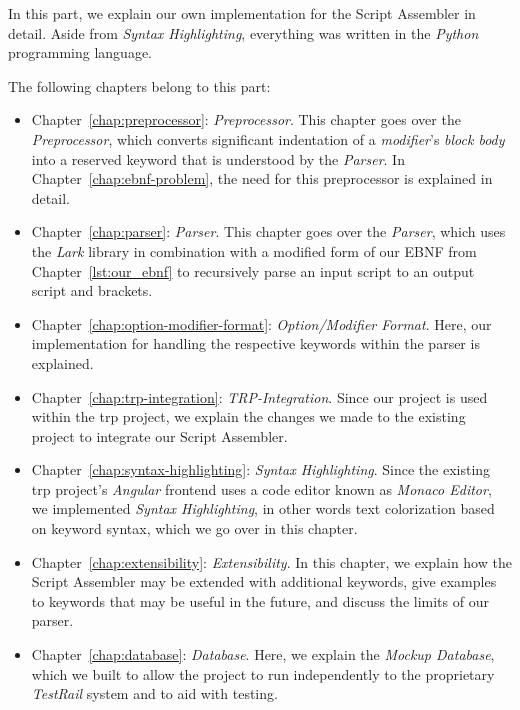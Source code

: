 
In this part, we explain our own implementation for the Script Assembler in detail. Aside from \textit{Syntax Highlighting}, everything was written in the \textit{Python} programming language.

The following chapters belong to this part:
\begin{itemize}
    \item Chapter~\ref{chap:preprocessor}: \textit{Preprocessor}. This chapter goes over the \textit{Preprocessor}, which converts significant indentation of a \textit{modifier}'s \textit{block body} into a reserved keyword that is understood by the \textit{Parser}. In Chapter~\ref{chap:ebnf-problem}, the need for this preprocessor is explained in detail.
    \item Chapter~\ref{chap:parser}: \textit{Parser}. This chapter goes over the \textit{Parser}, which uses the \textit{Lark} library in combination with a modified form of our EBNF from Chapter~\ref{lst:our_ebnf} to recursively parse an input script to an output script and brackets. 
    \item Chapter~\ref{chap:option-modifier-format}: \textit{Option/Modifier Format}. Here, our implementation for handling the respective keywords within the parser is explained. 
    \item Chapter~\ref{chap:trp-integration}: \textit{TRP-Integration}. Since our project is used within the \gls{trp} project, we explain the changes we made to the existing project to integrate our Script Assembler.
    \item Chapter~\ref{chap:syntax-highlighting}: \textit{Syntax Highlighting}. Since the existing \gls{trp} project's \textit{Angular} frontend uses a code editor known as \textit{Monaco Editor}, we implemented \textit{Syntax Highlighting}, in other words text colorization based on keyword syntax, which we go over in this chapter.
    \item Chapter~\ref{chap:extensibility}: \textit{Extensibility}. In this chapter, we explain how the Script Assembler may be extended with additional keywords, give examples to keywords that may be useful in the future, and discuss the limits of our parser. 
    \item Chapter~\ref{chap:database}: \textit{Database}. Here, we explain the \textit{Mockup Database}, which we built to allow the project to run independently to the proprietary \textit{TestRail} system and to aid with testing.
\end{itemize}

